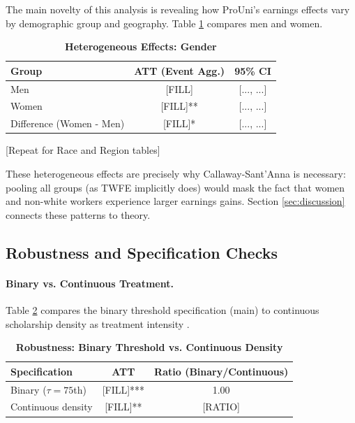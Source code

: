 The main novelty of this analysis is revealing how ProUni's earnings effects vary by demographic group and geography. Table \ref{tab:het_gender} compares men and women.

\begin{table}[ht]
\centering
\caption{\textbf{Heterogeneous Effects: Gender}}
\label{tab:het_gender}
\begin{tabular}{lcc}
\hline
Group & ATT (Event Agg.) & 95\% CI \\
\hline
Men & [FILL] & [..., ...] \\
Women & [FILL]** & [..., ...] \\
Difference (Women - Men) & [FILL]* & [..., ...] \\
\hline
\end{tabular}
\end{table}

[Repeat for Race and Region tables]

These heterogeneous effects are precisely why Callaway-Sant'Anna is necessary: pooling all groups (as TWFE implicitly does) would mask the fact that women and non-white workers experience larger earnings gains. Section \ref{sec:discussion} connects these patterns to theory.

\subsection{Robustness and Specification Checks}

\paragraph{Binary vs. Continuous Treatment.}
Table \ref{tab:rob_continuous} compares the binary threshold specification (main) to continuous scholarship density as treatment intensity .

\begin{table}[ht]
\centering
\caption{\textbf{Robustness: Binary Threshold vs. Continuous Density}}
\label{tab:rob_continuous}
\begin{tabular}{lcc}
\hline
Specification & ATT & Ratio (Binary/Continuous) \\
\hline
Binary ($\tau = 75$th) & [FILL]*** & 1.00 \\
Continuous density & [FILL]** & [RATIO] \\
\hline
\end{tabular}
\end{table}

